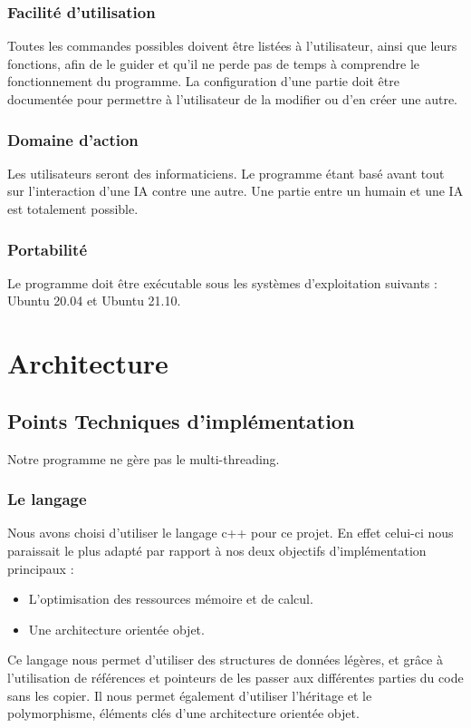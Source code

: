 \documentclass{article}
\begin{document}
\subsubsection{Facilité d'utilisation} 
Toutes les commandes possibles doivent être listées à l'utilisateur, ainsi que leurs fonctions, afin de le guider et qu'il ne perde pas de temps à comprendre le fonctionnement du programme.
La configuration d'une partie doit être documentée pour permettre à l'utilisateur de la modifier ou d'en créer une autre.
\medskip
\subsubsection{Domaine d'action} 
Les utilisateurs seront des informaticiens. Le programme étant basé avant tout sur l'interaction d'une IA contre une autre. 
Une partie entre un humain et une IA est totalement possible.
\medskip
\subsubsection{Portabilité} 
Le programme doit être exécutable sous les systèmes d'exploitation suivants : Ubuntu 20.04 et Ubuntu 21.10.

\newpage
\section{Architecture}

\subsection{Points Techniques d'implémentation}
Notre programme ne gère pas le multi-threading.

\subsubsection{Le langage}

Nous avons choisi d'utiliser le langage c++ pour ce projet. En effet celui-ci nous paraissait le plus adapté par rapport à nos deux objectifs d'implémentation principaux :
\begin{itemize}
    \item L'optimisation des ressources mémoire et de calcul.
    \item Une architecture orientée objet.
\end{itemize}
Ce langage nous permet d'utiliser des structures de données légères, et grâce à l'utilisation de références et pointeurs de les passer aux différentes parties du code sans les copier.
Il nous permet également d'utiliser l'héritage et le polymorphisme, éléments clés d'une architecture orientée objet.
\end{document}
